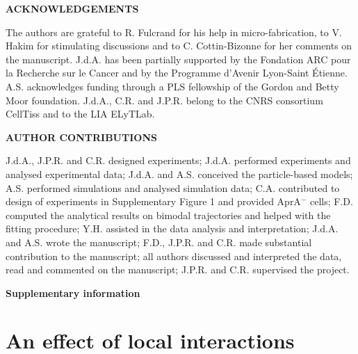 \documentclass[11pt, twocolumn]{article}
\begin{document}




\vspace{1cm}



{\textbf{ACKNOWLEDGEMENTS}}

{\small The authors are grateful to R. Fulcrand for his help in micro-fabrication, to V. Hakim for stimulating
  discussions and to C. Cottin-Bizonne for her comments on the manuscript. J.d.A. has been partially supported by the Fondation
  ARC pour la Recherche sur le Cancer and by the Programme d'Avenir
  Lyon-Saint \'Etienne. A.S. acknowledges funding through a PLS
  fellowship of the Gordon and Betty Moor foundation. J.d.A., C.R. and
  J.P.R. belong to the CNRS consortium CellTiss and to the LIA
  ELyTLab.  } \vspace{24pt}


{\textbf{AUTHOR CONTRIBUTIONS}}

{\small J.d.A., J.P.R. and C.R. designed experiments; J.d.A.
  performed experiments and analysed experimental data; J.d.A. and
  A.S. conceived the particle-based models; A.S. performed simulations
  and analysed simulation data; C.A. contributed to design of
  experiments in Supplementary Figure 1 and provided AprA$^{-}$ cells;
  F.D. computed the analytical results on bimodal trajectories and
  helped with the fitting procedure; Y.H. assisted in the data
  analysis and interpretation; J.d.A. and A.S. wrote the manuscript;
  F.D., J.P.R. and C.R. made substantial contribution to the
  manuscript; all authors discussed and interpreted the data, read and
  commented on the manuscript; J.P.R. and C.R. supervised the project.
}

\vspace{24pt}
\newpage
%


\renewcommand{\figurename}{Supplementary Figure}
\setcounter{figure}{0}
\onecolumn
\begin{center}
{\LARGE\bf Supplementary information\\}
\end{center}

\section{An effect of local interactions}
\end{document}
